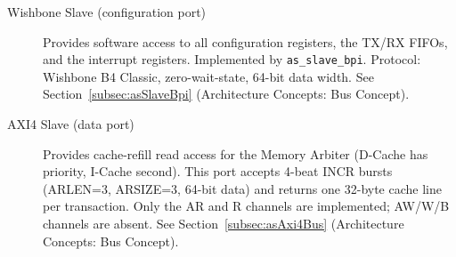 \begin{description}
  \item[Wishbone Slave (configuration port)] Provides software access to all configuration
    registers, the TX/RX FIFOs, and the interrupt registers. Implemented by \texttt{as\_slave\_bpi}.
    Protocol: Wishbone B4 Classic, zero-wait-state, 64-bit data width.
    See Section~\ref{subsec:asSlaveBpi} (Architecture Concepts: Bus Concept).

  \item[AXI4 Slave (data port)] Provides cache-refill read access for the Memory Arbiter
    (D-Cache has priority, I-Cache second). This port accepts 4-beat INCR bursts
    (ARLEN=3, ARSIZE=3, 64-bit data) and returns one 32-byte cache line per transaction.
    Only the AR and R channels are implemented; AW/W/B channels are absent.
    See Section~\ref{subsec:asAxi4Bus} (Architecture Concepts: Bus Concept).
\end{description}


